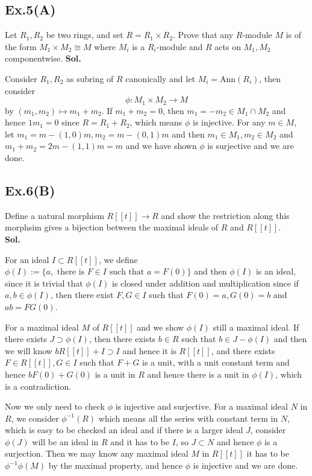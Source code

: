 \documentclass[lang=en,11pt,a4paper,citestyle =authoryear]{elegantpaper}
\begin{document}
\subsection*{Ex.5(A)} 
Let $R_1,R_2$ be two rings, and set $R = R_1\times R_2$. Prove that any $R$-module $M$ is of the form $M_1\times M_2 \cong M$ where $M_i$ is a $R_i$-module and $R$ acts on $M_1,M_2$ componentwise.
\vspace{0.5em}
\textbf{Sol.} \par
Consider $R_1,R_2$ as subring of $R$ canonically and let $M_i = \text{Ann}(R_i)$, then consider
\[
\phi:M_1\times M_2 \to M
\]
by $(m_1,m_2)\mapsto m_1+m_2$. If $m_1+m_2 = 0$, then $m_1 = -m_2 \in M_1\cap M_2$ and hence $1m_1 = 0$ since $R = R_1+R_2$, which means $\phi$ is injective. For any $m\in M$, let $m_1 = m - (1,0)m, m_2 = m-(0,1)m$ and then $m_1\in M_1,m_2\in M_2$ and $m_1+m_2 = 2m - (1,1) m = m$ and we have shown $\phi$ is surjective and we are done.
\par 
\vspace{0.5em}

\subsection*{Ex.6(B)} 
    Define a natural morphism $R[[t]] \to R$ and show the restriction along this morphsim gives a bijection between the maximal ideals of $R$ and $R[[t]]$.
\vspace{0.5em}\\
\textbf{Sol.} \par
    For an ideal $I\subset R[[t]]$, we define $\phi(I):=\{a,\text{ there is }F\in I\text{ such that }a = F(0)\}$ and then $\phi(I)$ is an ideal, since it is trivial that $\phi(I)$ is closed under addition and multiplication since if $a,b\in \phi(I)$, then there exist $F,G \in I$ such that $F(0) = a, G(0) =b$ and $ab = FG(0)$.\par
    For a maximal ideal $M$ of $R[[t]]$ and we show $\phi(I)$ still a maximal ideal. If there exists $J \supset \phi(I)$, then there exists $b\in R$ such that $b\in J - \phi(I)$ and then we will know $bR[[t]] + I \supset I$ and hence it is $R[[t]]$, and there exists $F\in R[[t]], G\in I$ such that $F+G$ is a unit, with a unit constant term and hence $bF(0)+G(0)$ is a unit in $R$ and hence there is a unit in $\phi(I)$, which is a contradiction.\par
    Now we only need to check $\phi$ is injective and surjective. For a maximal ideal $N$ in $R$, we consider $\phi^{-1}(R)$ which means all the series with constant term in $N$, which is easy to be checked an ideal and if there is a larger ideal $J$, consider $\phi(J)$ will be an ideal in $R$ and it has to be $I$, so $J\subset N$ and hence $\phi$ is a surjection. Then we may know any maximal ideal $M$ in $R[[t]]$ it has to be $\phi^{-1}\phi(M)$ by the maximal property, and hence $\phi$ is injective and we are done.
\vspace{0.5em}
\end{document}
